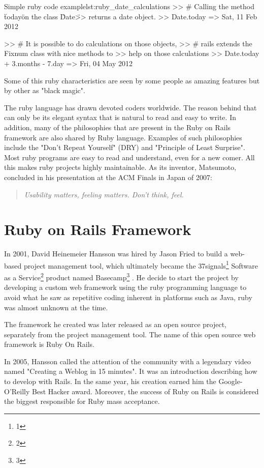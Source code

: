 \begin{rubycode}{Simple ruby code example}{lst:ruby_date_calculations}
  >> # Calling the method \"today\" on the class \"Date\" 
  >> returns a date object.
  >> Date.today 
  => Sat, 11 Feb 2012

  >> # It is possible to do calculations on those objects, 
  >> # rails extends the Fixnum class with nice methods to 
  >> help on those calculations
  >> Date.today + 3.months - 7.day
  => Fri, 04 May 2012
\end{rubycode}

Some of this ruby characteristics are seen by some people as amazing features but by other as "black magic".

The ruby language has drawn devoted coders worldwide.
The reason behind that can only be its elegant syntax that is natural to read and easy to write. 
In addition, many of the philosophies that are present in the Ruby on Rails framework are also shared by Ruby language.
Examples of such philosophies include the "Don't Repeat Yourself" (DRY) and "Principle of Least Surprise".
Most ruby programs are easy to read and understand, even for a new comer. 
All this makes ruby projects highly maintainable.
As its inventor, Matsumoto, concluded in his presentation at the ACM Finals in Japan of 2007: 
\begin{quote}\emph{
  Usability matters, feeling matters. Don't think, feel.
}\end{quote}




\section{Ruby on Rails Framework} 
In 2001, David Heinemeier Hansson was hired by Jason Fried to build a web-based project management tool, 
which ultimately became the 
\textsf{37signals}\footnote{
 1
}
\textsf{Software as a Service}\footnote{
 2
}  
product named 
\textsf{Basecamp}\footnote{
  3
}
. 
He decide to start the project by developing a custom web framework using the ruby programming language
to avoid what he saw as repetitive coding inherent in platforms such as Java,
ruby was almost unknown at the time.

The framework he created was later released as an open source project, separately from the project management tool. 
The name of this open source web framework is Ruby On Rails.

In 2005, Hansson called the attention of the community with a legendary video named "Creating a Weblog in 15 minutes". 
It was an introduction describing how to develop with Rails.
In the same year, his creation earned him the Google-O'Reilly Best Hacker award.
Moreover, the success of Ruby on Rails is considered the biggest responsible for Ruby mass acceptance.

